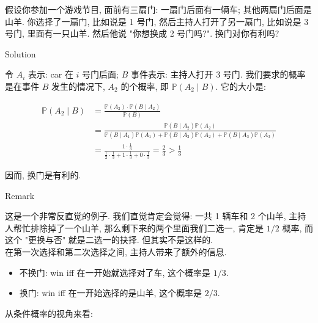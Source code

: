 \begin{example}

假设你参加一个游戏节目, 面前有三扇门: 一扇门后面有一辆车; 其他两扇门后面是山羊. 你选择了一扇门, 比如说是 1 号门, 然后主持人打开了另一扇门, 比如说是 3 号门, 里面有一只山羊. 然后他说 "你想换成 2 号门吗?". 换门对你有利吗?

\begin{qlsolution}{Solution}

令 \(\mathit{A}_{\mathit{i}}\) 表示: car 在 \(\mathit{i}\) 号门后面; \(\mathit{B}\) 事件表示: 主持人打开 3 号门. 我们要求的概率是在事件 \(\mathit{B}\) 发生的情况下, \(\mathit{A}_{2}\) 的个概率, 即 \(\mathbb{P}(\mathit{A}_{2} \mid \mathit{B})\). 它的大小是:

\[\begin{matrix}
{\mathbb{P}(\mathit{A}_{2} \mid \mathit{B})} & {= \frac{\mathbb{P}(\mathit{A}_{2}) \cdot \mathbb{P}(\mathit{B} \mid \mathit{A}_{2})}{\mathbb{P}(\mathit{B})}} \\
 & {= \frac{\mathbb{P}(\mathit{B} \mid \mathit{A}_{2})\mathbb{P}(\mathit{A}_{2})}{\mathbb{P}(\mathit{B} \mid \mathit{A}_{1})\mathbb{P}(\mathit{A}_{1}) + \mathbb{P}(\mathit{B} \mid \mathit{A}_{2})\mathbb{P}(\mathit{A}_{2}) + \mathbb{P}(\mathit{B} \mid \mathit{A}_{3})\mathbb{P}(\mathit{A}_{3})}} \\
 & {= \frac{1 \cdot \frac{1}{3}}{\frac{1}{2} \cdot \frac{1}{3} + 1 \cdot \frac{1}{3} + 0 \cdot \frac{1}{3}} = \frac{2}{3} > \frac{1}{3}}
\end{matrix}\]

因而, 换门是有利的.

\end{qlsolution}

\begin{qlremark}{Remark}

这是一个非常反直觉的例子. 我们直觉肯定会觉得: 一共 1 辆车和 2 个山羊, 主持人帮忙排除掉了一个山羊, 那么剩下来的两个里面我们二选一, 肯定是 \(1/2\) 概率, 而这个 "更换与否" 就是二选一的抉择. 但其实不是这样的.\\
在第一次选择和第二次选择之间, 主持人带来了额外的信息.

\begin{itemize}
\item
  不换门: win iff 在一开始就选择对了车, 这个概率是 \(1/3\).
\item
  换门: win iff 在一开始选择的是山羊, 这个概率是 \(2/3\).
\end{itemize}

从条件概率的视角来看:


\end{qlremark}
\end{example}
